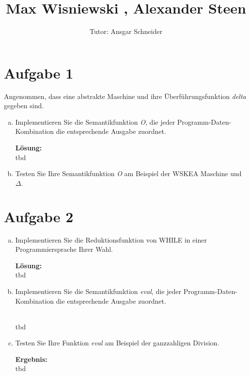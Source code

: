 \documentclass[11pt,a4paper,ngerman]{article}
\author{Tutor: Ansgar Schneider}
\date{}
\title{Max Wisniewski , Alexander Steen}
\begin{document}

\maketitle
\thispagestyle{fancy}



\section*{Aufgabe 1}

Angenommen, dass eine abstrakte Maschine und ihre Überführungsfunktion \emph{delta} gegeben sind.

\begin{enumerate}[a)]
    \item   Implementieren Sie die Semantikfunktion \emph{O}, die jeder Programm-Daten-Kombination
            die entsprechende Ausgabe zuordnet.

            \textbf{Lösung:}\\
            tbd

    \item   Testen Sie Ihre Semantikfunktion \emph{O} am Beispiel der WSKEA Maschine und $\Delta$.

\end{enumerate}

\section*{Aufgabe 2}
\begin{enumerate}[a)]
    \item   Implementieren Sie die Reduktionsfunktion von WHILE in einer Programmiersprache
            Ihrer Wahl.

            \textbf{Lösung:}\\
            tbd

    \item   Implementieren Sie die Semantikfunktion \emph{eval}, die jeder Programm-Daten-Kombination
            die entsprechende Ausgabe zuordnet.

            \\
            tbd

    \item   Testen Sie Ihre Funktion \emph{eval} am Beispiel der ganzzahligen Division.

            \textbf{Ergebnis:}\\
            tbd
\end{enumerate}
\end{document}
